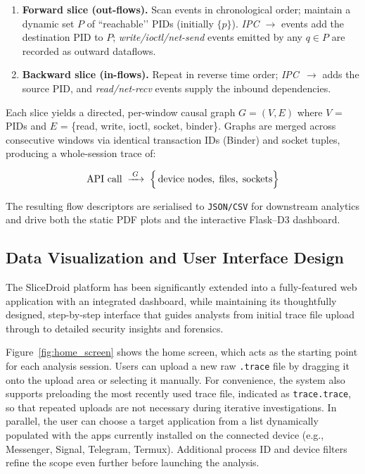 \documentclass[a4paper,12pt]{report}
\begin{document}
\begin{enumerate}
  \item \textbf{Forward slice (out-flows).}
        Scan events in chronological order; maintain a dynamic set
        $P$ of “reachable’’ PIDs (initially $\{p\}$).
        \emph{IPC $\rightarrow$} events add the destination PID to $P$;
        \emph{write/ioctl/net-send} events emitted by any
        $q\!\in\!P$ are recorded as outward dataflows.
  \item \textbf{Backward slice (in-flows).}
        Repeat in reverse time order; \emph{IPC~$\rightarrow$} adds
        the source PID, and \emph{read/net-recv} events supply the
        inbound dependencies.
\end{enumerate}

Each slice yields a directed, per-window causal graph
$G=(V,E)$ where
$V$ = PIDs and $E$ = \{read, write, ioctl, socket, binder\}.
Graphs are merged across consecutive windows via identical
transaction IDs (Binder) and socket tuples, producing a
whole-session trace of:

\[
  \text{API call} \;\xrightarrow{\;G\;}\;
  \Bigl\{\,
     \text{device nodes},\;
     \text{files},\;
     \text{sockets}
  \Bigr\}
\]

\noindent
The resulting flow descriptors are serialised to
\texttt{JSON/CSV} for downstream analytics and drive both the static
PDF plots and the interactive Flask–D3 dashboard.


\subsection{Data Visualization and User Interface Design}

The SliceDroid platform has been significantly extended into a fully-featured web application with an integrated dashboard, while maintaining its thoughtfully designed, step-by-step interface that guides analysts from initial trace file upload through to detailed security insights and forensics.

Figure~\ref{fig:home_screen} shows the home screen, which acts as the starting point for each analysis session. Users can upload a new raw \texttt{.trace} file by dragging it onto the upload area or selecting it manually. For convenience, the system also supports preloading the most recently used trace file, indicated as \texttt{trace.trace}, so that repeated uploads are not necessary during iterative investigations.
In parallel, the user can choose a target application from a list dynamically populated with the apps currently installed on the connected device (e.g., Messenger, Signal, Telegram, Termux).
 Additional process ID and device filters refine the scope even further before launching the analysis.
\end{document}
